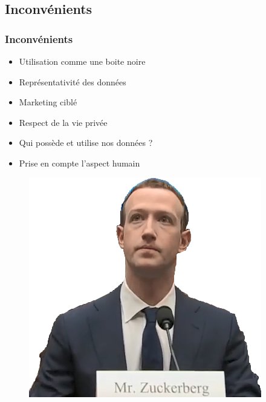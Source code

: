 \documentclass[compress]{beamer}
\begin{document}
\subsection{Inconvénients}
\begin{frame}
\frametitle{Inconvénients}
 
\begin{itemize}
	\item Utilisation comme une boite noire
	\item Représentativité des données
	\item Marketing ciblé
	\item Respect de la vie privée
	\item Qui possède et utilise nos données ?
	\item Prise en compte l'aspect humain
\end{itemize}

		\begin{figure}
			\centering
			\includegraphics[width=0.43\linewidth]{resources/clem/zucc}
		\end{figure}
\end{frame}
\end{document}
